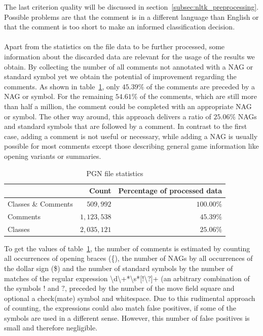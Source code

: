 \documentclass[article,type=msc,colorback,accentcolor=tud7b]{tudthesis}
\begin{document}
    The last criterion quality will be discussed in section~\ref{subsec:nltk_preprocessing}. Possible problems are that the comment is in a different language than English or that the comment is too short to make an informed classification decision. \\\\
    Apart from the statistics on the file data to be further processed, some information about the discarded data are relevant for the usage of the results we obtain. By collecting the number of all comments not annotated with a NAG or standard symbol yet we obtain the potential of improvement regarding the comments. As shown in table~\ref{tab:file_statistics}, only $45.39\%$ of the comments are preceded by a NAG or symbol. For the remaining $54.61\%$ of the comments, which are still more than half a million, the comment could be completed with an appropriate NAG or symbol. The other way around, this approach delivers a ratio of $25.06\%$ NAGs and standard symbols that are followed by a comment. In contrast to the first case, adding a comment is not useful or necessary, while adding a NAG is usually possible for most comments except those describing general game information like opening variants or summaries.
	
	\begin{table}[H]
      \begin{tabular}{| l | r | r |}
    	\hline
    	 & Count & Percentage of processed data \\ \hline
    	Classes \& Comments & $509,992$ & $100.00\%$ \\ \hline
    	Comments & $1,123,538$ & $45.39\%$ \\ \hline
    	Classes & $2,035,121$ & $25.06\%$ \\ \hline
      \end{tabular}
      \caption{PGN file statistics}
      \label{tab:file_statistics}
	\end{table}
	
    To get the values of table~\ref{tab:file_statistics}, the number of comments is estimated by counting all occurrences of opening braces (\{), the number of NAGs by all occurrences of the dollar sign (\$) and the number of standard symbols by the number of matches of the regular expression \textbackslash d\textbackslash+*\textbackslash s*[!\textbackslash?]+ (an arbitrary combination of the symbols $!$ and $?$, preceded by the number of the move field square and optional a check(mate) symbol and whitespace. Due to this rudimental approach of counting, the expressions could also match false positives, if some of the symbols are used in a different sense. However, this number of false positives is small and therefore negligible.	
\end{document}
